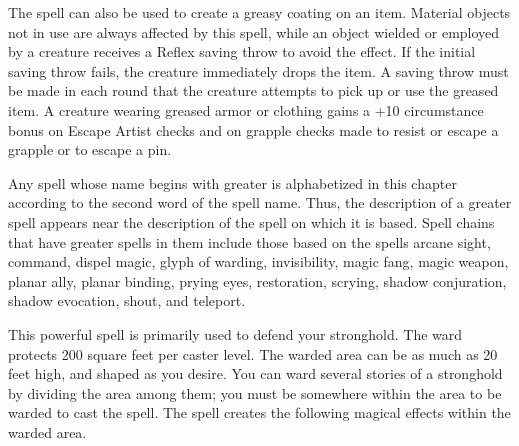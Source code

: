 \begin{multicols}{2}
\begin{small}
\smallskip\noindent The spell can also be used to create a greasy coating on an item. Material objects not in use are always affected by this spell, while an object wielded or employed by a creature receives a Reflex saving throw to avoid the effect. If the initial saving throw fails, the creature immediately drops the item. A saving throw must be made in each round that the creature attempts to pick up or use the greased item. A creature wearing greased armor or clothing gains a +10 circumstance bonus on Escape Artist checks and on grapple checks made to resist or escape a grapple or to escape a pin.


\noindent Any spell whose name begins with greater is alphabetized in this chapter according to the second word of the spell name. Thus, the description of a greater spell appears near the description of the spell on which it is based. Spell chains that have greater spells in them include those based on the spells arcane sight, command, dispel magic, glyph of warding, invisibility, magic fang, magic weapon, planar ally, planar binding, prying eyes, restoration, scrying, shadow conjuration, shadow evocation, shout, and teleport.

\noindent This powerful spell is primarily used to defend your stronghold. The ward protects 200 square feet per caster level. The warded area can be as much as 20 feet high, and shaped as you desire. You can ward several stories of a stronghold by dividing the area among them; you must be somewhere within the area to be warded to cast the spell. The spell creates the following magical effects within the warded area.


\end{small}
\end{multicols}

